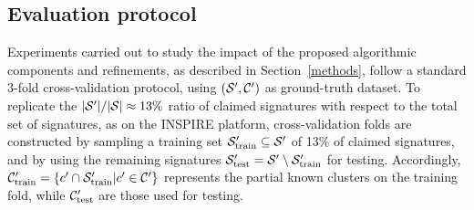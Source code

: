 \documentclass{article}
\begin{document}
\subsection{Evaluation protocol}

Experiments carried out to study the impact of the proposed algorithmic
components and refinements, as described in Section~\ref{methods}, follow a
standard 3-fold cross-validation protocol, using $({\cal S}^\prime, {\cal C}^\prime)$ as
ground-truth dataset. To replicate the $|{\cal S}^\prime| / |{\cal S}| \approx 13\%$ ratio
of claimed signatures with respect to the total set of signatures, as on the
INSPIRE platform, cross-validation folds are constructed by sampling a training
set ${\cal S}_\text{train}^\prime \subseteq {\cal S}^\prime$ of 13\% of claimed
signatures, and by using the remaining signatures ${\cal S}_\text{test}^\prime = {\cal S}^\prime \setminus {\cal S}_\text{train}^\prime$ for testing. Accordingly, ${\cal
C}_\text{train}^\prime = \{ c^\prime \cap {\cal S}_\text{train}^\prime |
c^\prime \in {\cal C}^\prime \}$ represents the partial known
clusters on the training fold, while ${\cal C}_\text{test}^\prime$ are those
used for testing.
\end{document}
